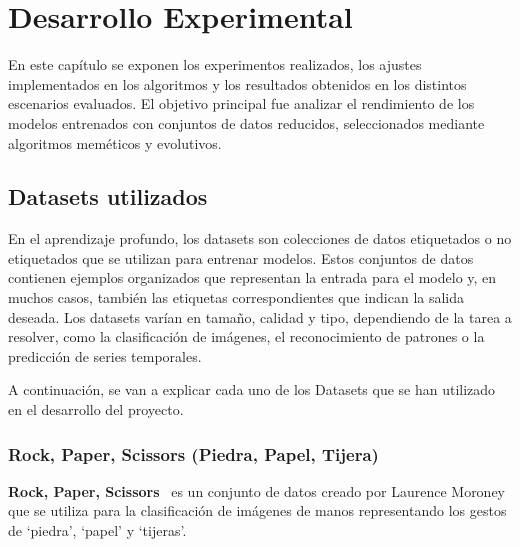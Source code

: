 
\chapter{Desarrollo Experimental}\label{ch:desarrollo-experimental}
En este capítulo se exponen los experimentos realizados, los ajustes implementados en los algoritmos y los resultados
obtenidos en los distintos escenarios evaluados.
El objetivo principal fue analizar el rendimiento de los modelos entrenados con conjuntos de datos reducidos,
seleccionados mediante algoritmos meméticos y evolutivos.

\section{Datasets utilizados}\label{sec:datasets}
En el aprendizaje profundo, los datasets son colecciones de datos etiquetados o no etiquetados que se utilizan para
entrenar modelos.
Estos conjuntos de datos contienen ejemplos organizados que representan la entrada para el modelo y, en muchos casos,
también las etiquetas correspondientes que indican la salida deseada.
Los datasets varían en tamaño, calidad y tipo, dependiendo de la tarea a resolver, como la clasificación de imágenes,
el reconocimiento de patrones o la predicción de series temporales.


A continuación, se van a explicar cada uno de los Datasets que se han utilizado en el desarrollo del proyecto.

\newpage

\subsection{Rock, Paper, Scissors (Piedra, Papel, Tijera)}\label{subsec:rock-paper-scissors}
\textbf{Rock, Paper, Scissors}~\cite{RockPaperScissors} es un conjunto de datos creado por Laurence Moroney
que se utiliza para la clasificación de imágenes de manos representando los gestos de `piedra', `papel' y `tijeras'.


